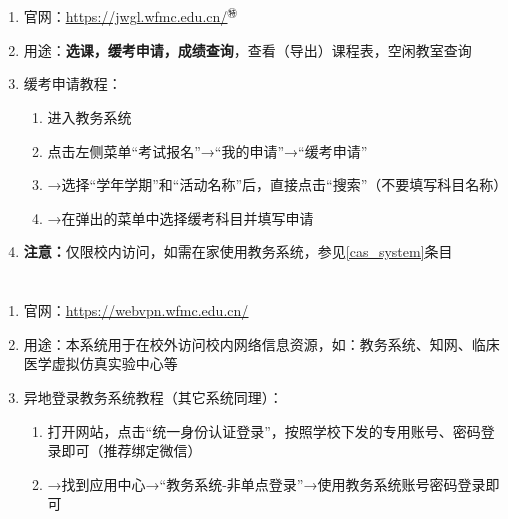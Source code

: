 \section[教务系统]{\textbf{}}
\begin{enumerate}
    \item 官网：\uline{\href{https://jwgl.wfmc.edu.cn/}{https://jwgl.wfmc.edu.cn/}$^㊕$}
    \item 用途：\textbf{选课，缓考申请，成绩查询}，查看（导出）课程表，空闲教室查询
    \item 缓考申请教程：
          \begin{enumerate}
              \item 进入教务系统
              \item 点击左侧菜单“考试报名”→“我的申请”→“缓考申请”
              \item →选择“学年学期”和“活动名称”后，直接点击“搜索”（不要填写科目名称）
              \item →在弹出的菜单中选择缓考科目并填写申请\footnotemark
          \end{enumerate}
    \item \textbf{注意：}仅限校内访问，如需在家使用教务系统，参见\uline{\ref{cas_system}}条目
\end{enumerate}

\section[资源访问控制系统（校内VPN）]{\textbf{}\footnotemark}
\label{cas_system}
\begin{enumerate}
    \item 官网：\uline{\href{https://webvpn.wfmc.edu.cn/}{https://webvpn.wfmc.edu.cn/}}
    \item 用途：本系统用于在校外访问校内网络信息资源，如：教务系统、知网、临床医学虚拟仿真实验中心\footnotemark 等
    \item 异地登录教务系统教程（其它系统同理）：
          \begin{enumerate}
              \item 打开网站，点击“统一身份认证登录”，按照学校下发的专用账号、密码登录即可（推荐绑定微信）
              \item →找到应用中心→“教务系统-非单点登录”\footnotemark →使用教务系统账号密码登录即可
          \end{enumerate}
\end{enumerate}

